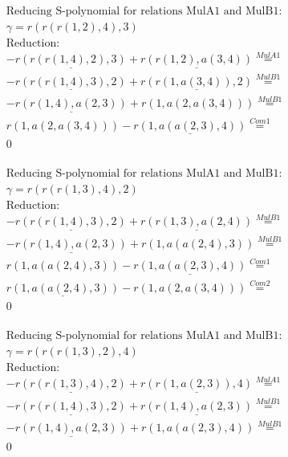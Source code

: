 \documentclass[11pt]{amsart}
\begin{document}
\begin{align*} 
& \text{Reducing S-polynomial for relations MulA1 and MulB1:} \\ 
& \gamma = r(r(r(1,2),4),3) \\ 
& \text{Reduction}: \\& - \underline{r(r(r(1,4),2),3)} + \underline{r(r(1,2),a(3,4))} \stackrel{ MulA1 }{=}  \\ 
& - \underline{r(r(r(1,4),3),2)} + \underline{r(r(1,a(3,4)),2)} \stackrel{ MulB1 }{=}  \\ 
& - \underline{r(r(1,4),a(2,3))} + r(1,a(2,a(3,4))) \stackrel{ MulB1 }{=}  \\ 
&r(1,a(2,a(3,4))) - \underline{r(1,a(a(2,3),4))} \stackrel{ Com1 }{=}  \\ 
&0\\ 
\end{align*} 
 
\begin{align*} 
& \text{Reducing S-polynomial for relations MulA1 and MulB1:} \\ 
& \gamma = r(r(r(1,3),4),2) \\ 
& \text{Reduction}: \\& - \underline{r(r(r(1,4),3),2)} + \underline{r(r(1,3),a(2,4))} \stackrel{ MulB1 }{=}  \\ 
& - \underline{r(r(1,4),a(2,3))} + r(1,a(a(2,4),3)) \stackrel{ MulB1 }{=}  \\ 
&r(1,a(a(2,4),3)) - \underline{r(1,a(a(2,3),4))} \stackrel{ Com1 }{=}  \\ 
&\underline{r(1,a(a(2,4),3))} - r(1,a(2,a(3,4))) \stackrel{ Com2 }{=}  \\ 
&0\\ 
\end{align*} 
 
\begin{align*} 
& \text{Reducing S-polynomial for relations MulA1 and MulB1:} \\ 
& \gamma = r(r(r(1,3),2),4) \\ 
& \text{Reduction}: \\& - \underline{r(r(r(1,3),4),2)} + \underline{r(r(1,a(2,3)),4)} \stackrel{ MulA1 }{=}  \\ 
& - \underline{r(r(r(1,4),3),2)} + \underline{r(r(1,4),a(2,3))} \stackrel{ MulB1 }{=}  \\ 
& - \underline{r(r(1,4),a(2,3))} + r(1,a(a(2,3),4)) \stackrel{ MulB1 }{=}  \\ 
&0\\ 
\end{align*} 
 
\end{document}
